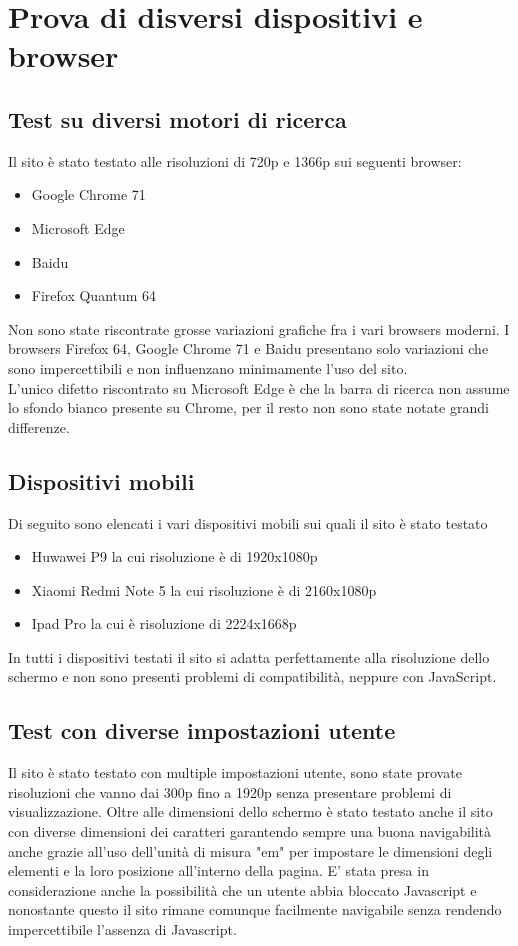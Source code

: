 \documentclass[openany, a4paper, 12pt]{report}
\begin{document}
	\section{Prova di disversi dispositivi e browser}
		\subsection{Test su diversi motori di ricerca}
			Il sito è stato testato alle risoluzioni di 720p e 1366p sui seguenti browser:
				\begin{itemize}
					\item Google Chrome 71
					\item Microsoft Edge
					\item Baidu
					\item Firefox Quantum 64
				\end{itemize}
				Non sono state riscontrate grosse variazioni grafiche fra i vari browsers moderni. I browsers Firefox 64, Google Chrome 71 e Baidu presentano solo variazioni che sono impercettibili e non influenzano minimamente l'uso del sito.\\
				L'unico difetto riscontrato su Microsoft Edge è che la barra di ricerca non assume lo sfondo bianco presente su Chrome, per il resto non sono state notate grandi differenze.
				
				\subsection{Dispositivi mobili}
				Di seguito sono elencati i vari dispositivi mobili sui quali il sito è stato testato
				\begin{itemize}
				\item Huwawei P9 la cui risoluzione è di 1920x1080p
				\item Xiaomi Redmi Note 5 la cui risoluzione è di 2160x1080p
				\item Ipad Pro la cui è risoluzione di 2224x1668p
				\end{itemize}
			
				In tutti i dispositivi testati il sito si adatta perfettamente alla risoluzione dello schermo e non sono presenti problemi di compatibilità, neppure con JavaScript.\\
				\subsection{Test con diverse impostazioni utente}
				Il sito è stato testato con multiple impostazioni utente, sono state provate risoluzioni che vanno dai 300p fino a 1920p senza presentare problemi di visualizzazione. Oltre alle dimensioni dello schermo è stato testato anche il sito con diverse dimensioni dei caratteri garantendo sempre una buona navigabilità anche grazie all'uso dell'unità di misura "em" per impostare le dimensioni degli elementi e la loro posizione all'interno della pagina. E' stata presa in considerazione anche la possibilità che un utente abbia bloccato Javascript e nonostante questo il sito rimane comunque facilmente navigabile senza rendendo impercettibile l'assenza di Javascript.
\end{document}
